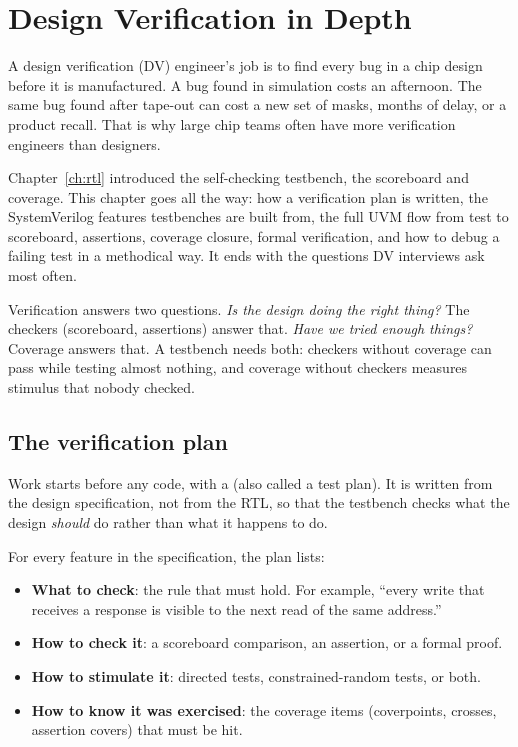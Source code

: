 \chapter{Design Verification in Depth}
\label{ch:dv}

A design verification (DV) engineer's job is to find every bug in a chip design before it is manufactured. A bug found in simulation costs an afternoon. The same bug found after tape-out can cost a new set of masks, months of delay, or a product recall. That is why large chip teams often have more verification engineers than designers.

Chapter~\ref{ch:rtl} introduced the self-checking testbench, the scoreboard and coverage. This chapter goes all the way: how a verification plan is written, the SystemVerilog features testbenches are built from, the full UVM flow from test to scoreboard, assertions, coverage closure, formal verification, and how to debug a failing test in a methodical way. It ends with the questions DV interviews ask most often.

\begin{bigidea}
Verification answers two questions. \emph{Is the design doing the right thing?} The checkers (scoreboard, assertions) answer that. \emph{Have we tried enough things?} Coverage answers that. A testbench needs both: checkers without coverage can pass while testing almost nothing, and coverage without checkers measures stimulus that nobody checked.
\end{bigidea}

\section{The verification plan}

Work starts before any code, with a  (also called a test plan). It is written from the design specification, not from the RTL, so that the testbench checks what the design \emph{should} do rather than what it happens to do.

For every feature in the specification, the plan lists:
\begin{itemize}
  \item \textbf{What to check}: the rule that must hold. For example, ``every write that receives a response is visible to the next read of the same address.''
  \item \textbf{How to check it}: a scoreboard comparison, an assertion, or a formal proof.
  \item \textbf{How to stimulate it}: directed tests, constrained-random tests, or both.
  \item \textbf{How to know it was exercised}: the coverage items (coverpoints, crosses, assertion covers) that must be hit.
\end{itemize}

